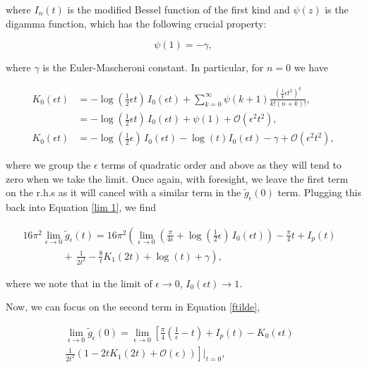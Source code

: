 \documentclass{article}
\numberwithin{equation}{section} %
\begin{document}
\noindent where $I_n(t)$ is the modified Bessel function of the first kind\cite{bessel1} and $\psi(z)$ is the digamma function\cite{digamma}, which has the following crucial property:

\begin{equation}
\psi(1) = -\gamma,
\end{equation}

\noindent where $\gamma$ is the Euler-Mascheroni constant\cite{euler-mascheroni}. In particular, for $n=0$ we have

\begin{equation}
\begin{split}
K_0(\epsilon t) &= -\log(\frac{1}{2}\epsilon t)\, I_0(\epsilon t) 
+ \sum^\infty_{k=0}\psi(k+1)\frac{(\frac{1}{4}\epsilon t^2)^k}{k!(n+k)!},\\
&= -\log(\frac{1}{2}\epsilon t)\, I_0(\epsilon t) +  \psi(1) + \mathcal{O}(\epsilon^2t^2),\\
K_0(\epsilon t)&= -\log(\frac{1}{2}\epsilon)\, I_0(\epsilon t) - \log(t)I_0(\epsilon t) - \gamma + \mathcal{O}(\epsilon^2t^2),
\end{split}
\end{equation}

\noindent where we group the $\epsilon$ terms of quadratic order and above as they will tend to zero when we take the limit. Once again, with foresight, we leave the first term on the r.h.s as it will cancel with a similar term in the $\tilde{g}_\epsilon(0)$ term. Plugging this back into Equation \ref{lim 1}, we find

\begin{equation}
\begin{split}
16\pi^2 \lim_{\epsilon\rightarrow 0} \tilde{g}_\epsilon(t) = 16\pi^2 \left( \lim_{\epsilon\rightarrow 0} \left( \frac{\pi}{4\epsilon} +\log(\frac{1}{2}\epsilon)\, I_0(\epsilon t)\right) - \frac{\pi}{4} t + I_p(t)  \right. &\\
 \left. \quad \quad \quad \quad + \, \frac{1}{2t^2} - \frac{8}{t}K_1(2t) + \log(t) + \gamma \right),&
\end{split}
\label{lim 11}
\end{equation}

\noindent where we note that in the limit of $\epsilon\rightarrow 0$, $I_0(\epsilon t) \rightarrow 1$.

Now, we can focus on the second term in Equation \ref{ftilde},

\begin{equation*}
\begin{split}
\lim_{\epsilon \rightarrow 0}\tilde{g}_\epsilon(0) = \lim_{\epsilon \rightarrow 0} \left[\frac{\pi}{4}\left( \frac{1}{\epsilon} - t\right) + I_p(t) - K_0(\epsilon t) \right. &\\
 \left. \frac{1}{2t^2} \left( 1 - 2tK_1(2t) + \mathcal{O}(\epsilon)\right) \right]\bigg\vert_{t=0},& 
\end{split}
\end{equation*}
\end{document}
